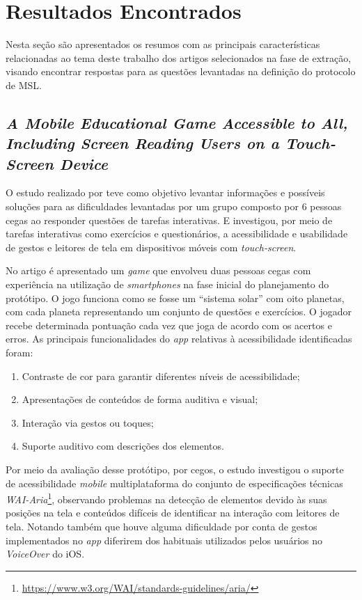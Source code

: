 \newpage{}

\section{Resultados Encontrados}

Nesta seção são apresentados os resumos com as principais características relacionadas ao tema deste trabalho dos artigos selecionados na fase de extração,
visando encontrar respostas para as questões levantadas na definição do protocolo de MSL\@.

\subsection{\emph{A Mobile Educational Game Accessible to All, Including Screen Reading Users on a Touch-Screen Device}}

O estudo realizado por  teve como objetivo levantar informações e possíveis soluções para as dificuldades levantadas por um grupo composto por 6 pessoas cegas ao responder questões de tarefas interativas.
E investigou, por meio de tarefas interativas como exercícios e questionários, a acessibilidade e usabilidade de gestos e leitores de tela em dispositivos móveis com \emph{touch-screen}.

No artigo é apresentado um \emph{game} que envolveu duas pessoas cegas com experiência na utilização de \emph{smartphones} na fase inicial do planejamento do protótipo.
O jogo funciona como se fosse um ``sistema solar'' com oito planetas, com cada planeta representando um conjunto de questões e exercícios.
O jogador recebe determinada pontuação cada vez que joga de acordo com os acertos e erros.
As principais funcionalidades do \emph{app} relativas à acessibilidade identificadas foram:

\begin{enumerate}
    \item Contraste de cor para garantir diferentes níveis de acessibilidade;
    \item Apresentações de conteúdos de forma auditiva e visual;
    \item Interação via gestos ou toques;
    \item Suporte auditivo com descrições dos elementos.
\end{enumerate}

Por meio da avaliação desse protótipo, por cegos, o estudo investigou o suporte de acessibilidade \emph{mobile} multiplataforma do conjunto de especificações
técnicas \emph{WAI-Aria}\footnote{\url{https://www.w3.org/WAI/standards-guidelines/aria/}}, observando problemas na detecção de elementos devido às suas posições
na tela e conteúdos difíceis de identificar na interação com leitores de tela.
Notando também que houve alguma dificuldade por conta de gestos implementados no \emph{app} diferirem dos habituais utilizados pelos usuários no \emph{VoiceOver} do iOS.

